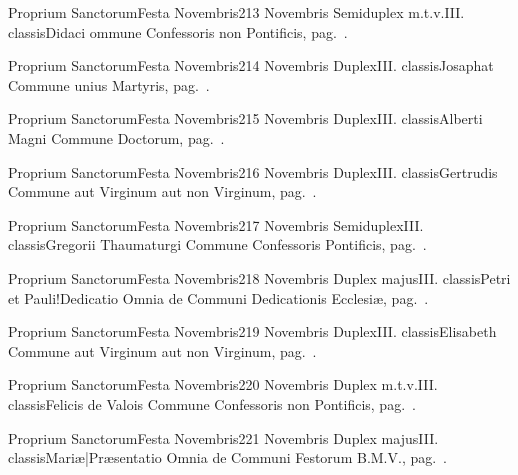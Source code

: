 \documentclass[nocturnale-romanum.tex]{subfiles}
\begin{document}
	{Proprium Sanctorum}{Festa Novembris}{2}{13 Novembris}
	{Semiduplex m.t.v.}{III. classis}{Didaci}
	{ommune Confessoris non Pontificis, pag.\ \pageref{M-CONP}.}
	{}

	{Proprium Sanctorum}{Festa Novembris}{2}{14 Novembris}
	{Duplex}{III. classis}{Josaphat}
	{Commune unius Martyris, pag.\ \pageref{M-UMEX}.}
	{}

	{Proprium Sanctorum}{Festa Novembris}{2}{15 Novembris}
	{Duplex}{III. classis}{Alberti Magni}
	{Commune Doctorum, pag.\ \pageref{M-CODO}.}
	{}

	{Proprium Sanctorum}{Festa Novembris}{2}{16 Novembris}
	{Duplex}{III. classis}{Gertrudis}
	{Commune aut Virginum aut non Virginum, pag.\ \pageref{M-MU}.}
	{}

	{Proprium Sanctorum}{Festa Novembris}{2}{17 Novembris}
	{Semiduplex}{III. classis}{Gregorii Thaumaturgi}
	{Commune Confessoris Pontificis, pag.\ \pageref{M-COPO}.}
	{}

	{Proprium Sanctorum}{Festa Novembris}{2}{18 Novembris}
	{Duplex majus}{III. classis}{Petri et Pauli!Dedicatio}
	{Omnia de Communi Dedicationis Ecclesiæ, pag.\ \pageref{M-CDED}.}
	{}

	{Proprium Sanctorum}{Festa Novembris}{2}{19 Novembris}
	{Duplex}{III. classis}{Elisabeth}
	{Commune aut Virginum aut non Virginum, pag.\ \pageref{M-MU}.}
	{}

	{Proprium Sanctorum}{Festa Novembris}{2}{20 Novembris}
	{Duplex m.t.v.}{III. classis}{Felicis de Valois}
	{Commune Confessoris non Pontificis, pag.\ \pageref{M-CONP}.}
	{}

	{Proprium Sanctorum}{Festa Novembris}{2}{21 Novembris}
	{Duplex majus}{III. classis}{Mariæ|Præsentatio}
	{Omnia de Communi Festorum B.M.V., pag.\ \pageref{M-CBMV}.}
	{}
\end{document}
